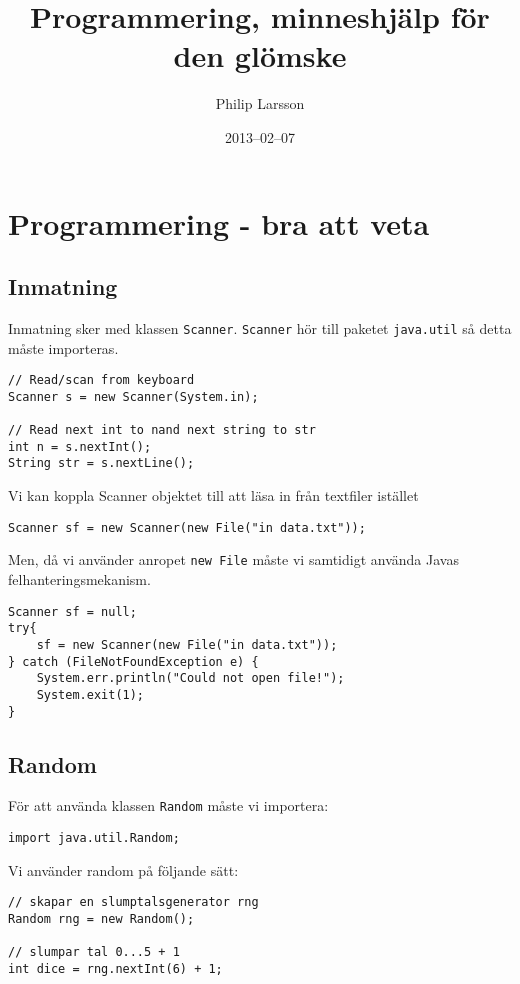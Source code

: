 \documentclass[11pt]{article}
\title{Programmering, minneshjälp för den glömske}
\author{Philip Larsson}
\date{2013--02--07}
\begin{document}
\maketitle



\section{Programmering - bra att veta}
\subsection{Inmatning}
Inmatning sker med klassen \verb+Scanner+. \verb+Scanner+ hör till paketet \verb+java.util+ så detta måste importeras.

\begin{lstlisting} 
// Read/scan from keyboard
Scanner s = new Scanner(System.in);

// Read next int to nand next string to str
int n = s.nextInt();
String str = s.nextLine();
\end{lstlisting}
Vi kan koppla Scanner objektet till att läsa in från textfiler istället
\begin{lstlisting}
Scanner sf = new Scanner(new File("in data.txt"));
\end{lstlisting}
Men, då vi använder anropet \verb+new File+ måste vi samtidigt använda Javas felhanteringsmekanism.
\begin{lstlisting}
Scanner sf = null;
try{
	sf = new Scanner(new File("in data.txt"));
} catch (FileNotFoundException e) {
	System.err.println("Could not open file!");
	System.exit(1);
}
\end{lstlisting}	

\subsection{Random}
För att använda klassen \verb+Random+ måste vi importera:
\begin{lstlisting}
import java.util.Random;
\end{lstlisting}
Vi använder random på följande sätt:
\begin{lstlisting}
// skapar en slumptalsgenerator rng 
Random rng = new Random();	

// slumpar tal 0...5 + 1 
int dice = rng.nextInt(6) + 1;	
\end{lstlisting}
\end{document}
